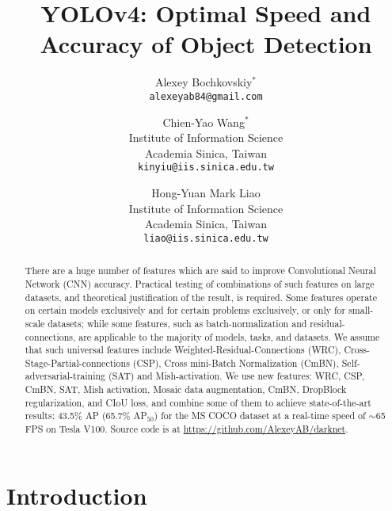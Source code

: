 \documentclass[10pt,twocolumn,letterpaper]{article}
\begin{document}
\title{YOLOv4: Optimal Speed and Accuracy of Object Detection}

\author{Alexey Bochkovskiy$^*$\\
{\tt\small alexeyab84@gmail.com}
\and
Chien-Yao Wang$^*$\\
Institute of Information Science\\
Academia Sinica, Taiwan\\
{\tt\small kinyiu@iis.sinica.edu.tw}
\and
Hong-Yuan Mark Liao\\
Institute of Information Science\\
Academia Sinica, Taiwan\\
{\tt\small liao@iis.sinica.edu.tw}
}

\maketitle

\begin{abstract}
  There are a huge number of features which are said to improve Convolutional Neural Network (CNN) accuracy. Practical testing of combinations of such features on large datasets, and theoretical justification of the result, is required. Some features operate on certain models exclusively and for certain problems exclusively, or only for small-scale datasets; while some features, such as batch-normalization and residual-connections, are applicable to the majority of models, tasks, and datasets. We assume that such universal features include Weighted-Residual-Connections (WRC), Cross-Stage-Partial-connections (CSP), Cross mini-Batch Normalization (CmBN), Self-adversarial-training (SAT) and Mish-activation.  We use new features: WRC, CSP, CmBN, SAT, Mish activation, Mosaic data augmentation, CmBN, DropBlock regularization, and CIoU loss, and combine some of them to achieve state-of-the-art results: 43.5\% AP (65.7\% AP$_{50}$) for the MS COCO dataset at a real-time speed of $\sim$65 FPS on Tesla V100. Source code is at \url{https://github.com/AlexeyAB/darknet}.

\end{abstract}


\section{Introduction}
\end{document}
